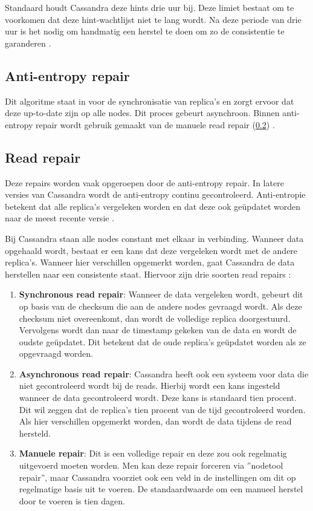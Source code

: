 Standaard houdt Cassandra deze hints drie uur bij.
Deze limiet bestaat om te voorkomen dat deze hint-wachtlijst niet te lang wordt.
Na deze periode van drie uur is het nodig om handmatig een herstel te doen om zo de consistentie te garanderen \citep{strickland2014availability}.

\subsection{Anti-entropy repair}
Dit algoritme staat in voor de synchronisatie van replica's en zorgt ervoor dat deze up-to-date zijn op alle nodes.
Dit proces gebeurt asynchroon.
Binnen anti-entropy repair wordt gebruik gemaakt van de manuele read repair (\ref{sec:read_repair}) \citep{strickland2014availability}.

\subsection{Read repair}
\label{sec:read_repair}
Deze repairs worden vaak opgeroepen door de anti-entropy repair.
In latere versies van Cassandra wordt de anti-entropy continu gecontroleerd.
Anti-entropie betekent dat alle replica's vergeleken worden en dat deze ook geüpdatet worden naar de meest recente versie \citep{Kunz2013Entropy}.

Bij Cassandra staan alle nodes constant met elkaar in verbinding.
Wanneer data opgehaald wordt, bestaat er een kans dat deze vergeleken wordt met de andere replica's.
Wanneer hier verschillen opgemerkt worden, gaat Cassandra de data herstellen naar een consistente staat.
Hiervoor zijn drie soorten read repairs \citep{strickland2014availability}:

\begin{enumerate}
	\item \textbf{Synchronous read repair}:
	Wanneer de data vergeleken wordt, gebeurt dit op basis van de checksum die aan de andere nodes gevraagd wordt.
	Als deze checksum niet overeenkomt, dan wordt de volledige replica doorgestuurd.
	Vervolgens wordt dan naar de timestamp gekeken van de data en wordt de oudste geüpdatet.
	Dit betekent dat de oude replica's geüpdatet worden als ze opgevraagd worden.
	
	\item \textbf{Asynchronous read repair}:
	Cassandra heeft ook een systeem voor data die niet gecontroleerd wordt bij de reads.
	Hierbij wordt een kans ingesteld wanneer de data gecontroleerd wordt.
	Deze kans is standaard tien procent.
	Dit wil zeggen dat de replica's tien procent van de tijd gecontroleerd worden.
	Als hier verschillen opgemerkt worden, dan wordt de data tijdens de read hersteld.
	
	\item \textbf{Manuele repair}:
	Dit is een volledige repair en deze zou ook regelmatig uitgevoerd moeten worden.
	Men kan deze repair forceren via ''nodetool repair'', maar Cassandra voorziet ook een veld in de instellingen om dit op regelmatige basis uit te voeren.
	De standaardwaarde om een manueel herstel door te voeren is tien dagen.
\end{enumerate}

